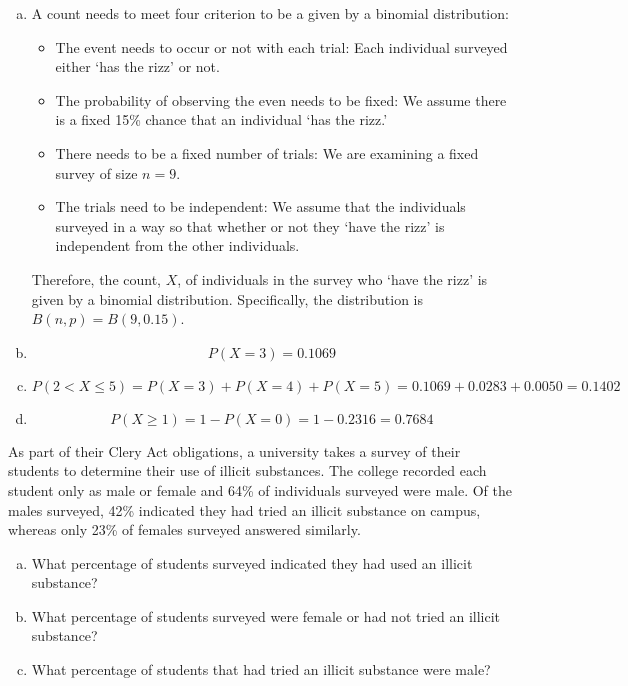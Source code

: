 \documentclass[12pt,letterpaper]{exam}
\begin{document}
\begin{questions}
\sol 
\begin{enumerate}[(a)]
\item A count needs to meet four criterion to be a given by a binomial distribution:
	\begin{itemize}
	\item The event needs to occur or not with each trial: Each individual surveyed either `has the rizz' or not. 
	\item The probability of observing the even needs to be fixed: We assume there is a fixed 15\% chance that an individual `has the rizz.' 
	\item There needs to be a fixed number of trials: We are examining a fixed survey of size $n= 9$. 
	\item The trials need to be independent: We assume that the individuals surveyed in a way so that whether or not they `have the rizz' is independent from the other individuals.
	\end{itemize}
Therefore, the count, $X$, of individuals in the survey who `have the rizz' is given by a binomial distribution. Specifically, the distribution is $B(n, p)= B(9, 0.15)$. \pspace

\item 
	\[
	P(X= 3)= 0.1069
	\] \pspace

\item 
	\[
	P(2 < X \leq 5)= P(X= 3) + P(X= 4) + P(X= 5)= 0.1069 + 0.0283 + 0.0050= 0.1402
	\] \pspace

\item 
	\[
	P(X \geq 1)= 1 - P(X= 0)= 1 - 0.2316= 0.7684
	\]
\end{enumerate}



\newpage
\question[15] As part of their Clery Act obligations, a university takes a survey of their students to determine their use of illicit substances. The college recorded each student only as male or female and 64\% of individuals surveyed were male. Of the males surveyed, 42\% indicated they had tried an illicit substance on campus, whereas only 23\% of females surveyed answered similarly. 
        \begin{enumerate}[(a)]
        \item What percentage of students surveyed indicated they had used an illicit substance?
        \item What percentage of students surveyed were female or had not tried an illicit substance?
        \item What percentage of students that had tried an illicit substance were male?
        \end{enumerate} \pspace


\end{questions}
\end{document}
